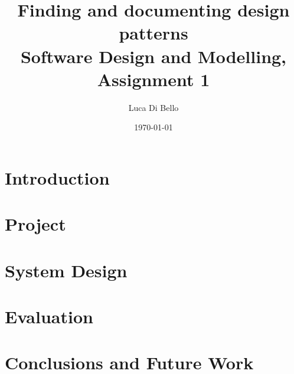 \documentclass[a4paper, 11pt]{article}
\title{Finding and documenting design patterns \\[1ex] \large Software Design and Modelling, Assignment 1}
\author{Luca Di Bello}
\date{\today}
\begin{document}
\maketitle
\tableofcontents

\section{Introduction}

\pagebreak

\section{Project}

\pagebreak

\section{System Design}

\pagebreak

\section{Evaluation}

\pagebreak

\section{Conclusions and Future Work}

\nocite{*} %

\end{document}
